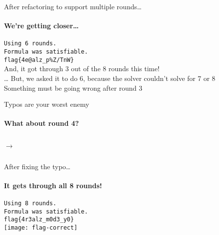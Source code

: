 \begin{frame}{After refactoring to support multiple rounds\ldots}
    \framesubtitle{We're getting closer\ldots}
    \begin{center}
        {\Large
            \texttt{Using 6 rounds.} \\
            \texttt{Formula was satisfiable.} \\
            \texttt{flag\{4e@alz\_p\%Z/TnW\}} \pause \\
            \vspace{0.3in}
            And, it got through 3 out of the 8 rounds this time! \pause \\
            \vspace{0.3in}
            \ldots\xspace But, we asked it to do 6, because the solver couldn't
            solve for 7 or 8 \pause \\
            \vspace{0.3in}
            Something must be going wrong after round 3
        }
    \end{center}
\end{frame}

\begin{frame}{Typos are your worst enemy}
    \framesubtitle{What about round 4?}
    \begin{columns}
        \begin{center}
            $\rightarrow$
        \end{center}
    \end{columns}
\end{frame}

\begin{frame}{After fixing the typo\ldots}
    \framesubtitle{It gets through all 8 rounds!}
    \begin{center}
        {\Large
            \texttt{Using 8 rounds.} \\
            \texttt{Formula was satisfiable.} \\
            \texttt{flag\{4r3alz\_m0d3\_y0\}} \\
        }
        \pause \vspace{0.3in}
        \texttt{[image: flag-correct]}
    \end{center}
\end{frame}

